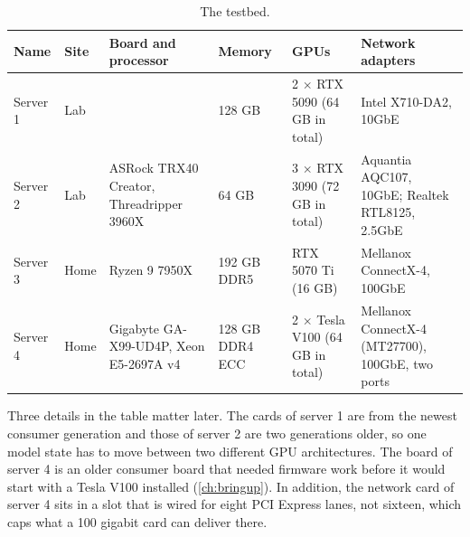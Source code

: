 \begin{table}[htbp]
  \centering
  \caption[The testbed]{The testbed.}
  \label{tab:servers}
  \small
  \begin{tabular}{L{1.5cm}L{1.0cm}L{3.3cm}L{1.8cm}L{2.6cm}L{3.3cm}}
    \toprule
    Name & Site & Board and processor & Memory & GPUs & Network adapters \\
    \midrule
    Server 1 & Lab & & 128 GB & 2 $\times$ RTX 5090 (64 GB in total) & Intel X710-DA2, 10GbE \\
    Server 2 & Lab & ASRock TRX40 Creator, Threadripper 3960X & 64 GB & 3 $\times$ RTX 3090 (72 GB in total) & Aquantia AQC107, 10GbE; Realtek RTL8125, 2.5GbE \\
    Server 3 & Home & Ryzen 9 7950X & 192 GB DDR5 & RTX 5070 Ti (16 GB) & Mellanox ConnectX-4, 100GbE \\
    Server 4 & Home & Gigabyte GA-X99-UD4P, Xeon E5-2697A v4 & 128 GB DDR4 ECC & 2 $\times$ Tesla V100 (64 GB in total) & Mellanox ConnectX-4 (MT27700), 100GbE, two ports \\
    \bottomrule
  \end{tabular}
  \par\smallskip{}
\end{table}

Three details in the table matter later. The cards of server 1 are from the
newest consumer generation and those of server 2 are two generations older,
so one model state has to move between two different GPU architectures. The
board of server 4 is an older consumer board that needed firmware work before
it would start with a Tesla V100 installed (\cref{ch:bringup}). In addition,
the network card of server 4 sits in a slot that is wired for eight PCI
Express lanes, not sixteen, which caps what a 100 gigabit card can deliver
there.

